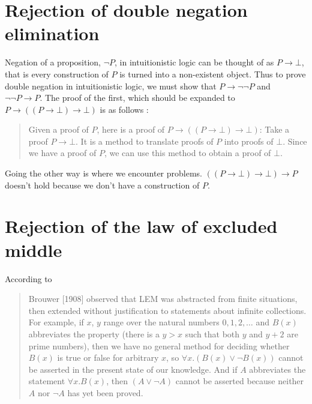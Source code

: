 \section{Rejection of double negation elimination}
Negation of a proposition, $\neg P$, in intuitionistic logic can be thought of as $P \rightarrow \bot$, that is every construction of $P$ is turned into a non-existent object. Thus to prove double negation in intuitionistic logic, we must show that $P \rightarrow \neg \neg P$ and $\neg \neg P \rightarrow P$. The proof of the first, which should be expanded to $P \rightarrow ((P \rightarrow \bot) \rightarrow \bot)$ is as follows :
\begin{quote}
Given a proof of $P$, here is a proof of $P \rightarrow ((P \rightarrow \bot) \rightarrow \bot)$: Take a proof $P \rightarrow \bot$. It is a method to translate proofs of $P$ into proofs of $\bot$. Since we have a proof of $P$, we can use this method to obtain a proof of $\bot$. \cite{CHnotes}
\end{quote}
Going the other way is where we encounter problems. $((P \rightarrow \bot) \rightarrow \bot) \rightarrow P$ doesn't hold because we don't have a construction of $P$.

\section{Rejection of the law of excluded middle}
According to \cite{stanfordLogic} 
\begin{quote}
Brouwer [1908] observed that LEM was abstracted from finite situations, then extended without justification to statements about infinite collections. For example, if $x$, $y$ range over the natural numbers $0, 1, 2, \ldots$ and $B(x)$ abbreviates the property (there is a $y > x$ such that both $y$ and $y+2$ are prime numbers), then we have no general method for deciding whether $B(x)$ is true or false for arbitrary $x$, so $\forall x . (B(x) \vee \neg B(x))$ cannot be asserted in the present state of our knowledge. And if $A$ abbreviates the statement $\forall x . B(x)$, then $(A \vee \neg A)$ cannot be asserted because neither $A$ nor $\neg A$ has yet been proved.
\end{quote}
